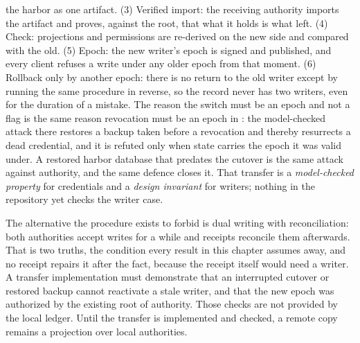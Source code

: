 \documentclass[11pt,a4paper]{article}
\theoremstyle{definition}
\theoremstyle{remark}
\begin{document}
the harbor as one artifact. (3) Verified import: the receiving authority
imports the artifact and proves, against the root, that what it holds is what
left. (4) Check: projections and permissions are re-derived on the new side
and compared with the old. (5) Epoch: the new writer's epoch is signed and
published, and every client refuses a write under any older epoch from that
moment. (6) Rollback only by another epoch: there is no return to the old
writer except by running the same procedure in reverse, so the record never
has two writers, even for the duration of a mistake. The reason the switch
must be an epoch and not a flag is the same reason revocation must be an
epoch in : the model-checked attack
there restores a backup taken before a revocation and thereby resurrects a
dead credential, and it is refuted only when state carries the epoch it was
valid under. A restored harbor database that predates the cutover is the same
attack against authority, and the same defence closes it. That transfer is a
\emph{model-checked property} for credentials and a \emph{design invariant}
for writers; nothing in the repository yet checks the writer case.
\begin{pdboundary}
\setlength{\parskip}{4pt plus 1pt}
The alternative the procedure exists to forbid is dual writing with
reconciliation: both authorities accept writes for a while and receipts
reconcile them afterwards. That is two truths, the condition every result in
this chapter assumes away, and no receipt repairs it after the fact, because
the receipt itself would need a writer.
A transfer implementation must demonstrate
that an interrupted cutover or restored backup cannot reactivate a stale writer,
and that the new epoch was authorized by the existing root of authority.
Those
checks are not provided by the local ledger. Until the transfer is implemented
and checked, a remote copy remains a projection over local authorities.
\end{pdboundary}
\pdexercisepointer{\ref{ex:swk-schema-rename}}{\ref{ex:swk-op7-sequencer}}{\pageref{ex:swk-schema-rename}}
\end{document}
